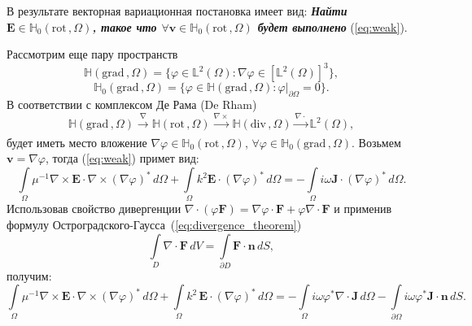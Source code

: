 \documentclass[a4paper,14pt]{article}
\begin{document}
В результате векторная вариационная постановка имеет вид: \textbf{\textit{Найти $\mathbf{E} \in \mathbb{H}_{0}( \mathrm{rot}\,, \Omega )$, такое что $\forall \mathbf{v} \in \mathbb{H}_{0}( \mathrm{rot}\,, \Omega )$ будет выполнено}} (\ref{eq:weak}).

Рассмотрим еще пару пространств~\citep{monk}
\begin{equation*}
	\mathbb{H}( \mathrm{grad}\,, \Omega ) = \lbrace \varphi \in \mathbb{L}^{2}(\Omega) : \nabla \varphi \in [ \mathbb{L}^{2}(\Omega) ]^{3} \rbrace , \label{eq:H_grad}
\end{equation*}
\begin{equation*}
	\mathbb{H}_{0}( \mathrm{grad}\,, \Omega ) = \lbrace \varphi \in \mathbb{H}( \mathrm{grad}\,, \Omega ) : \left. \varphi \right | _{\partial \Omega} = 0 \rbrace . \label{eq:H0_grad}
\end{equation*}
В соответствии с комплексом Де Рама (De Rham)~\citep{schwarzbach}
\begin{equation}
	\mathbb{H}( \mathrm{grad}\,, \Omega ) \xrightarrow[]{\nabla} \mathbb{H}( \mathrm{rot}\,, \Omega ) \xrightarrow[]{\nabla \times} \mathbb{H}( \mathrm{div}\,, \Omega ) \xrightarrow[]{\nabla \cdot} \mathbb{L}^{2}(\Omega) , \label{eq:derham}
\end{equation}
будет иметь место вложение $\nabla \varphi \in \mathbb{H}_{0}( \mathrm{rot}\,, \Omega )$, $\forall \varphi \in \mathbb{H}_{0}( \mathrm{grad}\,, \Omega )$. Возьмем $\mathbf{v} = \nabla \varphi$, тогда (\ref{eq:weak}) примет вид:
\begin{equation*}
	\int\limits_\Omega \mu^{-1} \nabla \times \mathbf{E} \cdot \nabla \times (\nabla \varphi)^{*} \,d\Omega + \int\limits_\Omega k^{2} \mathbf{E} \cdot (\nabla \varphi)^{*} \,d\Omega = - \int\limits_\Omega i \omega \mathbf{J} \cdot (\nabla \varphi)^{*} \,d\Omega .
\end{equation*}
Использовав свойство дивергенции $\nabla \cdot (\varphi \mathbf{F}) = \nabla \varphi \cdot \mathbf{F} + \varphi \nabla \cdot \mathbf{F}$ и применив формулу Ос\-т\-ро\-г\-ра\-д\-с\-ко\-го-Гаусса~(\ref{eq:divergence_theorem})
\begin{equation}
	\int\limits_{D} \nabla \cdot \mathbf{F} \,dV = \int\limits_{\partial D} \mathbf{F} \cdot \mathbf{n} \,dS ,
	\label{eq:divergence_theorem}
\end{equation}
получим:
\begin{equation*}
	\int\limits_\Omega \mu^{-1} \nabla \times \mathbf{E} \cdot \nabla \times (\nabla \varphi)^{*} \,d\Omega + \int\limits_\Omega k^{2}\, \mathbf{E} \cdot (\nabla \varphi)^{*} \,d\Omega = - \int\limits_\Omega i \omega \varphi^{*} \nabla \cdot \mathbf{J} \,d\Omega - \int\limits_{\partial \Omega} i \omega \varphi^{*} \mathbf{J} \cdot \mathbf{n} \,d S .
\end{equation*}
\end{document}
